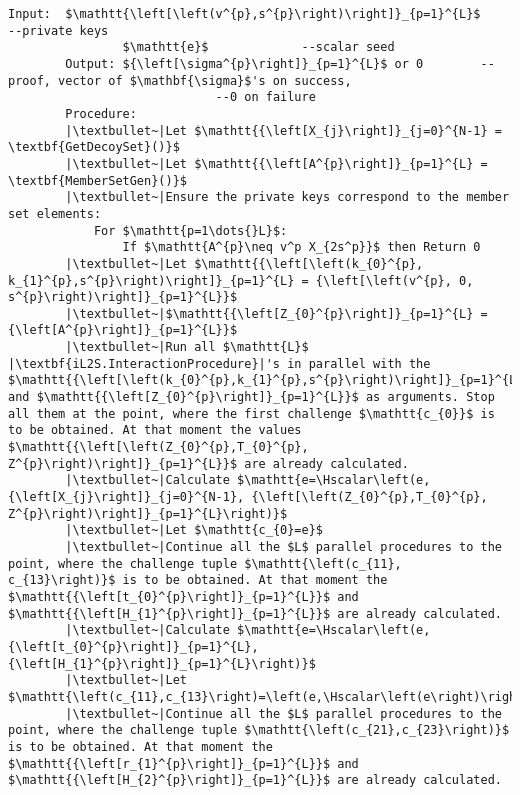 \documentclass{mathcryptology} %
\newcommand{\Hscalar}{\textbf{H}_{\textbf{scalar}}}
\theoremstyle{title}
\theoremstyle{titleof}
\begin{document}
\begin{itemize}
        \begin{mdframed}[backgroundcolor=black!10!white]
        \begin{lstlisting}[caption={\textbf{mL2SHPoM.GetProof} specification.},label={Lis:4}]
        Input:  $\mathtt{\left[\left(v^{p},s^{p}\right)\right]}_{p=1}^{L}$             --private keys
                $\mathtt{e}$             --scalar seed
        Output: ${\left[\sigma^{p}\right]}_{p=1}^{L}$ or 0        --proof, vector of $\mathbf{\sigma}$'s on success,
                             --0 on failure
        Procedure:
        |\textbullet~|Let $\mathtt{{\left[X_{j}\right]}_{j=0}^{N-1} = \textbf{GetDecoySet}()}$
        |\textbullet~|Let $\mathtt{{\left[A^{p}\right]}_{p=1}^{L} = \textbf{MemberSetGen}()}$
        |\textbullet~|Ensure the private keys correspond to the member set elements:
            For $\mathtt{p=1\dots{}L}$:
                If $\mathtt{A^{p}\neq v^p X_{2s^p}}$ then Return 0
        |\textbullet~|Let $\mathtt{{\left[\left(k_{0}^{p}, k_{1}^{p},s^{p}\right)\right]}_{p=1}^{L} = {\left[\left(v^{p}, 0, s^{p}\right)\right]}_{p=1}^{L}}$
        |\textbullet~|$\mathtt{{\left[Z_{0}^{p}\right]}_{p=1}^{L} = {\left[A^{p}\right]}_{p=1}^{L}}$
        |\textbullet~|Run all $\mathtt{L}$ |\textbf{iL2S.InteractionProcedure}|'s in parallel with the $\mathtt{{\left[\left(k_{0}^{p},k_{1}^{p},s^{p}\right)\right]}_{p=1}^{L}}$ and $\mathtt{{\left[Z_{0}^{p}\right]}_{p=1}^{L}}$ as arguments. Stop all them at the point, where the first challenge $\mathtt{c_{0}}$ is to be obtained. At that moment the values $\mathtt{{\left[\left(Z_{0}^{p},T_{0}^{p}, Z^{p}\right)\right]}_{p=1}^{L}}$ are already calculated.
        |\textbullet~|Calculate $\mathtt{e=\Hscalar\left(e,{\left[X_{j}\right]}_{j=0}^{N-1}, {\left[\left(Z_{0}^{p},T_{0}^{p}, Z^{p}\right)\right]}_{p=1}^{L}\right)}$
        |\textbullet~|Let $\mathtt{c_{0}=e}$
        |\textbullet~|Continue all the $L$ parallel procedures to the point, where the challenge tuple $\mathtt{\left(c_{11}, c_{13}\right)}$ is to be obtained. At that moment the $\mathtt{{\left[t_{0}^{p}\right]}_{p=1}^{L}}$ and $\mathtt{{\left[H_{1}^{p}\right]}_{p=1}^{L}}$ are already calculated.
        |\textbullet~|Calculate $\mathtt{e=\Hscalar\left(e,{\left[t_{0}^{p}\right]}_{p=1}^{L}, {\left[H_{1}^{p}\right]}_{p=1}^{L}\right)}$
        |\textbullet~|Let $\mathtt{\left(c_{11},c_{13}\right)=\left(e,\Hscalar\left(e\right)\right)}$
        |\textbullet~|Continue all the $L$ parallel procedures to the point, where the challenge tuple $\mathtt{\left(c_{21},c_{23}\right)}$ is to be obtained. At that moment the $\mathtt{{\left[r_{1}^{p}\right]}_{p=1}^{L}}$ and $\mathtt{{\left[H_{2}^{p}\right]}_{p=1}^{L}}$ are already calculated.

\end{lstlisting}
\end{mdframed}
\end{itemize}
\end{document}
